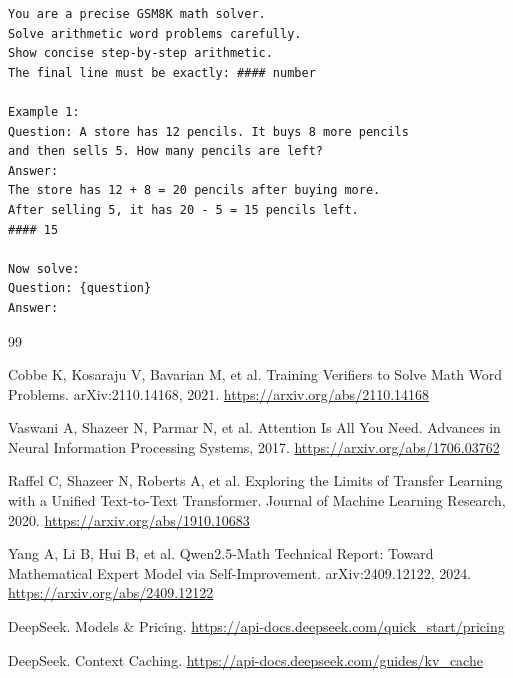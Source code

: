 \documentclass[UTF8,a4paper,zihao=-4]{ctexart}
\begin{document}
\begin{verbatim}
You are a precise GSM8K math solver.
Solve arithmetic word problems carefully.
Show concise step-by-step arithmetic.
The final line must be exactly: #### number

Example 1:
Question: A store has 12 pencils. It buys 8 more pencils
and then sells 5. How many pencils are left?
Answer:
The store has 12 + 8 = 20 pencils after buying more.
After selling 5, it has 20 - 5 = 15 pencils left.
#### 15

Now solve:
Question: {question}
Answer:
\end{verbatim}

\clearpage
\begin{thebibliography}{99}

Cobbe K, Kosaraju V, Bavarian M, et al.
Training Verifiers to Solve Math Word Problems.
arXiv:2110.14168, 2021.
\url{https://arxiv.org/abs/2110.14168}

Vaswani A, Shazeer N, Parmar N, et al.
Attention Is All You Need.
Advances in Neural Information Processing Systems, 2017.
\url{https://arxiv.org/abs/1706.03762}

Raffel C, Shazeer N, Roberts A, et al.
Exploring the Limits of Transfer Learning with a Unified Text-to-Text Transformer.
Journal of Machine Learning Research, 2020.
\url{https://arxiv.org/abs/1910.10683}

Yang A, Li B, Hui B, et al.
Qwen2.5-Math Technical Report: Toward Mathematical Expert Model via Self-Improvement.
arXiv:2409.12122, 2024.
\url{https://arxiv.org/abs/2409.12122}

DeepSeek.
Models \& Pricing.
\url{https://api-docs.deepseek.com/quick_start/pricing}

DeepSeek.
Context Caching.
\url{https://api-docs.deepseek.com/guides/kv_cache}

\end{thebibliography}
\end{document}
